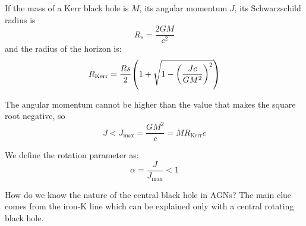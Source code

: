 \documentclass[10pt,a4paper,english]{article}
\let\originalleft\left
\let\originalright\right
\renewcommand{\left}{\mathopen{}\mathclose\bgroup\originalleft}
\renewcommand{\right}{\aftergroup\egroup\originalright}
\begin{document}
If the mass of a Kerr black hole is $M$, its angular momentum $J$, its
Schwarzschild radius is
\begin{equation}
    R_s = \frac{2GM}{c^2}
\end{equation}
and the radius of the horizon is:
\begin{equation}
    R_\mathrm{Kerr} = \frac{Rs}{2} \left( 1 + \sqrt{1-\left( \frac{Jc}{GM^2} \right)^2 } \right)
\end{equation}

The angular momentum cannot be higher than the value that makes the square root
negative, so
\begin{equation}
    J < J_\mathrm{max} = \frac{GM^2}{c} = MR_\mathrm{Kerr}c
\end{equation}

We define the rotation parameter as:
\begin{equation}
    \alpha = \frac{J}{J_\mathrm{max}} < 1
\end{equation}

How do we know the nature of the central black hole in AGNs? The main clue
comes from the iron-K line which can be explained only with a central rotating
black hole.
\end{document}
